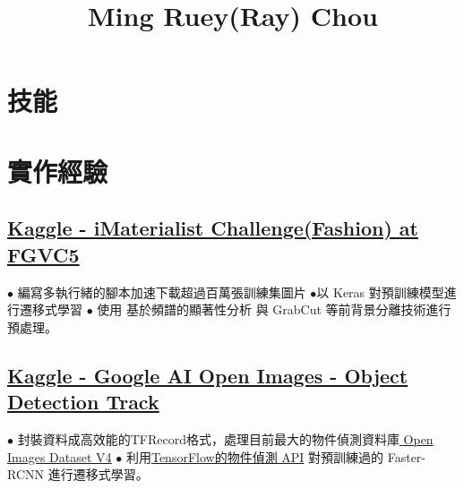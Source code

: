 \documentclass[11pt,a4paper]{moderncv}
\title{Ming Ruey(Ray) Chou}
\begin{document}
\maketitle
\vspace*{-12mm}

\section{技能}
\vspace{-0.7\baselineskip}

\section{實作經驗}

\subsection{\href{https://www.kaggle.com/c/imaterialist-challenge-fashion-2018}{\small Kaggle - iMaterialist Challenge(Fashion) at FGVC5}}
{\footnotesize{$\bullet$ 編寫多執行緒的腳本加速下載超過百萬張訓練集圖片\space\space 
\newline $\bullet$以 Keras 對預訓練模型進行遷移式學習
\newline $\bullet$ 使用 基於頻譜的顯著性分析 與 GrabCut 等前背景分離技術進行預處理。}}

\subsection{\href{https://www.kaggle.com/c/google-ai-open-images-object-detection-track}{\small Kaggle - Google AI Open Images - Object Detection Track}}
{\footnotesize{$\bullet$ 封裝資料成高效能的TFRecord格式，處理目前最大的物件偵測資料庫\href{https://storage.googleapis.com/openimages/web/index.html}{ Open Images Dataset V4}
\newline $\bullet$ 利用\href{https://github.com/tensorflow/models/tree/master/research/object_detection}{TensorFlow的物件偵測 API} 對預訓練過的 Faster-RCNN 進行遷移式學習。}}
\end{document}
